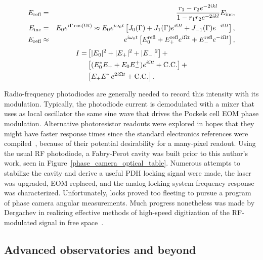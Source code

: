 \begin{eqnarray}
E_{\textup{refl}} &=& \frac{r_1 - r_2 e^{-2 i k l}}{1 - r_1 r_2 e^{-2 i k l}} E_\textup{inc},\\
E_\textup{inc} &=& E_0 e^{i \Gamma \cos \left( \Omega t \right)} \approx E_0 e^{i \omega_0 t} \left[ J_0 (\Gamma) + J_1 (\Gamma) e^{i\Omega t} + J_{-1} (\Gamma) e^{-i \Omega t} \right],\\
E_\textup{refl} &\approx& e^{i \omega_0 t} \left[ E_0^\textup{refl} + E_+^\textup{refl} e^{i\Omega t} + E_-^\textup{refl} e^{-i \Omega t}\right],
\end{eqnarray}
\begin{equation}
\begin{split}
I =& \left[ |E_0|^2 + |E_+|^2 + |E_-|^2\right] + \\ 
  & \left[(E_0^* E_+ + E_0 E^+_-)e^{i\Omega t} +\textup{C.C.} \right] + \\
  &\left[E_+ E_-^* e^{2i\Omega t} +\textup{C.C.} \right].
\end{split}
\end{equation}

Radio-frequency photodiodes are generally needed to record this intensity with its modulation.
Typically, the photodiode current is demodulated with a mixer that uses as local oscillator the same sine wave that drives the Pockels cell EOM phase modulation.
Alternative photoresistor readouts were explored in hopes that they might have faster response times since the standard electronics references were compiled~\cite{HorowitzHill1989,Simpson}, because of their potential desirability for a many-pixel readout.
Using the usual RF photodiode, a Fabry-Perot cavity was built prior to this author's work, seen in Figure~\ref{phase_camera_optical_table}.
Numerous attempts to stabilize the cavity and derive a useful PDH locking signal were made, the laser was upgraded, EOM replaced, and the analog locking system frequency response was characterized.
Unfortunately, locks proved too fleeting to pursue a program of phase camera angular measurements.
Much progress nonetheless was made by Dergachev in realizing effective methods of high-speed digitization of the RF-modulated signal in free space~\cite{DergachevThesis}.


        \subsection{Advanced observatories and beyond}
        \label{advanced}
  
